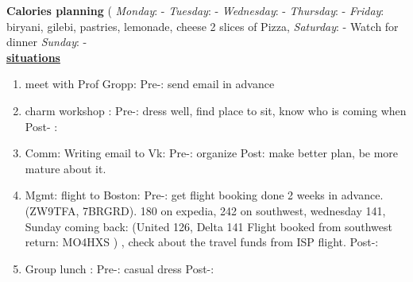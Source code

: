 \textbf{Calories planning}
{\small (
\textit{Monday}: -
\textit{Tuesday}: -
\textit{Wednesday}: -
\textit{Thursday}: -
\textit{Friday}: biryani, gilebi, pastries, lemonade, cheese 2 slices of Pizza,
\textit{Saturday}: -  Watch for dinner
\textit{Sunday}: -
 }\\

\underline{\textbf{situations}}\\
\begin{enumerate}
\item \small meet with Prof Gropp: Pre-:  send email in advance

\item \small charm workshop :  Pre-: dress well, find place to sit, know who is coming when Post- :

\item \small Comm: Writing email to Vk: Pre-:  organize Post: make
better plan, be more mature about it.

\item \small Mgmt: flight to Boston:  Pre-: get flight booking done 2
weeks in advance. (ZW9TFA, 7BRGRD). 180 on expedia, 242 on southwest,
wednesday 141, Sunday coming back: (United 126, Delta 141
Flight booked from southwest return:  MO4HXS )  , check about the
travel funds from ISP flight.  Post-:

\item \small Group lunch :  Pre-:  casual dress  Post-:

\end{enumerate}
\newpage

